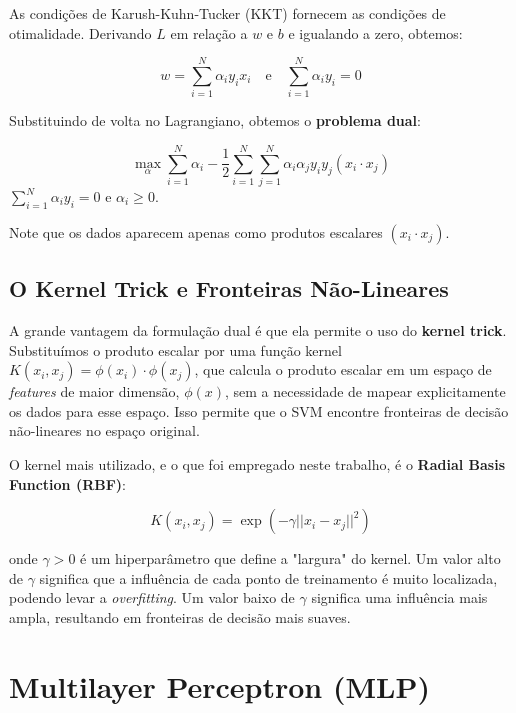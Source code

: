 \documentclass[12pt, a4paper, oneside]{report}
\begin{document}
As condições de Karush-Kuhn-Tucker (KKT) fornecem as condições de otimalidade. Derivando $L$ em relação a $w$ e $b$ e igualando a zero, obtemos:

\begin{equation}
    w = \sum_{i=1}^N \alpha_i y_i x_i \quad \text{e} \quad \sum_{i=1}^N \alpha_i y_i = 0
\end{equation}

Substituindo de volta no Lagrangiano, obtemos o \textbf{problema dual}:

\begin{equation}
    \max_{\alpha} \sum_{i=1}^N \alpha_i - \frac{1}{2} \sum_{i=1}^N \sum_{j=1}^N \alpha_i \alpha_j y_i y_j (x_i \cdot x_j)
\end{equation}
 $\sum_{i=1}^N \alpha_i y_i = 0$ e $\alpha_i \ge 0$.

Note que os dados aparecem apenas como produtos escalares $(x_i \cdot x_j)$.

\subsection{O Kernel Trick e Fronteiras Não-Lineares}

A grande vantagem da formulação dual é que ela permite o uso do \textbf{kernel trick}. Substituímos o produto escalar por uma função kernel $K(x_i, x_j) = \phi(x_i) \cdot \phi(x_j)$, que calcula o produto escalar em um espaço de \textit{features} de maior dimensão, $\phi(x)$, sem a necessidade de mapear explicitamente os dados para esse espaço. Isso permite que o SVM encontre fronteiras de decisão não-lineares no espaço original.

O kernel mais utilizado, e o que foi empregado neste trabalho, é o \textbf{Radial Basis Function (RBF)}:

\begin{equation}
    K(x_i, x_j) = \exp(-\gamma ||x_i - x_j||^2)
\end{equation}

onde $\gamma > 0$ é um hiperparâmetro que define a "largura" do kernel. Um valor alto de $\gamma$ significa que a influência de cada ponto de treinamento é muito localizada, podendo levar a \textit{overfitting}. Um valor baixo de $\gamma$ significa uma influência mais ampla, resultando em fronteiras de decisão mais suaves.

\section{Multilayer Perceptron (MLP)}
\end{document}
